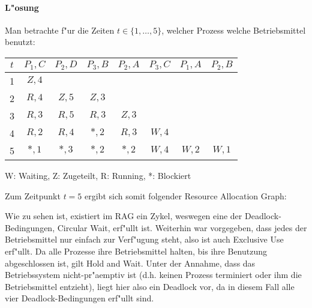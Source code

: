 \paragraph{L"osung}

Man betrachte f"ur die Zeiten $t \in \{1, \dots, 5\}$, welcher Prozess
welche Betriebsmittel benutzt:

\begin{center}
  \begin{tabular}{cccccccc}
    \toprule
    $t$ & $P_1,C$ & $P_2,D$ & $P_3,B$ & $P_2,A$ & $P_3,C$ & $P_1,A$ & $P_2,B$ \\
    \midrule
    1   & $Z,4$   &         &         &         &         &         &         \\
    2   & $R,4$   & $Z,5$   &  $Z,3$  &         &         &         &         \\
    3   & $R,3$   & $R,5$   &  $R,3$  & $Z,3$   &         &         &         \\
    4   & $R,2$   & $R,4$   &  $*,2$  & $R,3$   & $W,4$   &         &         \\
    5   & $*,1$   & $*,3$   &  $*,2$  & $*,2$   & $W,4$   & $W,2$   & $W,1$   \\
    \bottomrule
  \end{tabular}

$ $\\
W: Waiting, Z: Zugeteilt, R: Running, *: Blockiert \\
\end{center}

Zum Zeitpunkt $t = 5$ ergibt sich somit folgender Resource Allocation
Graph:

\begin{center}
\end{center}

Wie zu sehen ist, existiert im RAG ein Zykel, weswegen eine der
Deadlock-Bedingungen, Circular Wait, erf"ullt ist.  Weiterhin war
vorgegeben, dass jedes der Betriebsmittel nur einfach zur Verf"ugung
steht, also ist auch Exclusive Use erf"ullt.  Da alle Prozesse ihre
Betriebsmittel halten, bis ihre Benutzung abgeschlossen ist, gilt Hold
and Wait.  Unter der Annahme, dass das Betriebssystem nicht-pr"aemptiv
ist (d.h. keinen Prozess terminiert oder ihm die Betriebsmittel
entzieht), liegt hier also ein Deadlock vor, da in diesem Fall alle
vier Deadlock-Bedingungen erf"ullt sind.
